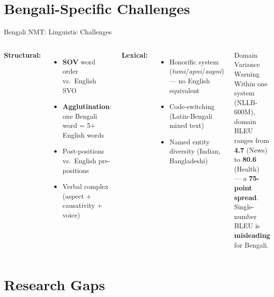 \documentclass[aspectratio=169,10pt]{beamer}
\begin{document}
\section{Bengali-Specific Challenges}

\begin{frame}{Bengali NMT: Linguistic Challenges}
  \begin{columns}
    \textbf{Structural:}
    \begin{itemize}
      \item \textbf{SOV} word order vs.\ English SVO
      \item \textbf{Agglutination}: one Bengali word = 5+ English words
      \item Post-positions vs.\ English pre-positions
      \item Verbal complex (aspect + causativity + voice)
    \end{itemize}
    \vspace{0.2cm}
    \textbf{Lexical:}
    \begin{itemize}
      \item Honorific system (\textit{tumi}/\textit{apni}/\textit{aapni}) --- no English equivalent
      \item Code-switching (Latin-Bengali mixed text)
      \item Named entity diversity (Indian, Bangladeshi)
    \end{itemize}

    \begin{alertblock}{Domain Variance Warning}
      Within one system (NLLB-600M),\\
      domain BLEU ranges from\\
      \textbf{4.7} (News) to \textbf{80.6} (Health)\\
      --- a \textbf{75-point spread}.\\
      \vspace{0.1cm}
      Single-number BLEU is\\
      \textbf{misleading} for Bengali.
    \end{alertblock}
  \end{columns}
\end{frame}

\section{Research Gaps}
\end{document}
